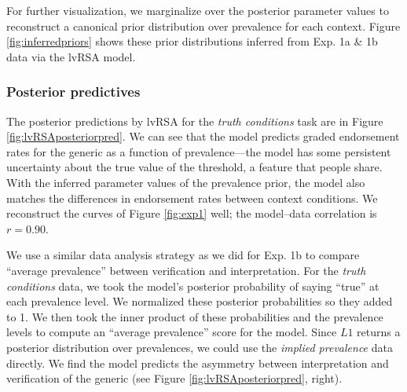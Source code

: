 \documentclass[10pt,letterpaper]{article}
\begin{document}
%

For further visualization, we marginalize over the posterior parameter values to reconstruct a canonical prior distribution over prevalence for each context. Figure \ref{fig:inferredpriors} shows these prior distributions inferred from Exp. 1a \& 1b data via the lvRSA model. 

\subsubsection{Posterior predictives}


The posterior predictions by lvRSA for the \emph{truth conditions} task are in Figure \ref{fig:lvRSAposteriorpred}. 
We can see that the model predicts graded endorsement rates for the generic as a function of prevalence---the model has some persistent uncertainty about the true value of the threshold, a feature that people share.
With the inferred parameter values of the prevalence prior, the model also matches the differences in endorsement rates between context conditions.
We reconstruct the curves of Figure \ref{fig:exp1} well; the model--data correlation is $r = 0.90$.


We use a similar data analysis strategy as we did for Exp. 1b to compare ``average prevalence'' between verification and interpretation. For the \emph{truth conditions} data, we took the model's posterior probability of saying ``true'' at each prevalence level. We normalized these posterior probabilities so they added to 1. We then took the inner product of these probabilities and the prevalence levels to compute an ``average prevalence'' score for the model. Since $L1$ returns a posterior distribution over prevalences, we could use the \emph{implied prevalence} data directly. We find the model predicts the asymmetry between interpretation and verification of the generic (see Figure \ref{fig:lvRSAposteriorpred}, right).
\end{document}
